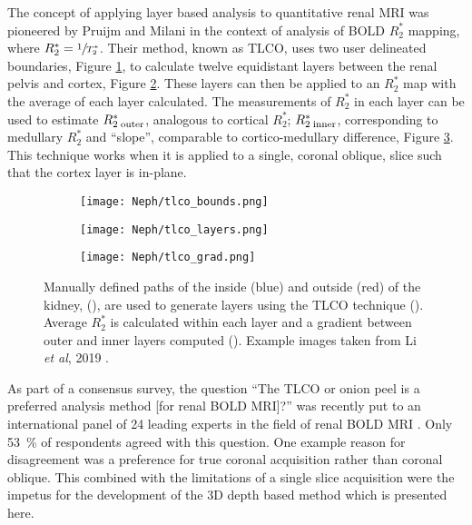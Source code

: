 The concept of applying layer based analysis to quantitative renal \ac{MRI} was pioneered by Pruijm and Milani \cite{piskunowicz_new_2015, milani_reduction_2017, pruijm_blood_2017, li_renal_2019} in the context of analysis of \ac{BOLD} $R_2^*$ mapping, where $R_2^*=\sfrac{1}{T_2^*}$. Their method, known as \ac{TLCO}, uses two user delineated boundaries, Figure \ref{fig:ex_tlco_bounds}, to calculate twelve equidistant layers between the renal pelvis and cortex, Figure \ref{fig:ex_tlco_layers}. These layers can then be applied to an $R_2^*$ map with the average of each layer calculated. The measurements of $R_2^*$ in each layer can be used to estimate $R_{2\;\textup{outer}}^*$, analogous to cortical $R_2^*$; $R_{2\;\textup{inner}}^*$, corresponding to medullary $R_2^*$ and ``slope'', comparable to  cortico-medullary difference, Figure \ref{fig:ex_tlco_grad}. This technique works when it is applied to a single, coronal oblique, slice such that the cortex layer is in-plane.

\begin{figure}[H]
	\centering
	\begin{subfigure}[c]{0.23\textwidth}
		\centering
		\texttt{[image: Neph/tlco\_bounds.png]}
		\caption{}
		\label{fig:ex_tlco_bounds}
	\end{subfigure}
	\hfill
	\begin{subfigure}[c]{0.23\textwidth}
		\centering
		\texttt{[image: Neph/tlco\_layers.png]}
		\caption{}
		\label{fig:ex_tlco_layers}
	\end{subfigure}
	\hfill
	\begin{subfigure}[c]{0.47\textwidth}
		\centering
		\texttt{[image: Neph/tlco\_grad.png]}
		\caption{}
		\label{fig:ex_tlco_grad}
	\end{subfigure}
	\caption{Manually defined paths of the inside (blue) and outside (red) of the kidney, (), are used to generate layers using the \ac{TLCO} technique (). Average $R_2^*$ is calculated within each layer and a gradient between outer and inner layers computed (). Example images taken from Li \textit{et al}, 2019 \cite{li_renal_2019}.}
	\label{fig:ex_tlco}
\end{figure}

As part of a consensus survey, the question ``The \ac{TLCO} or onion peel is a preferred analysis method [for renal \ac{BOLD} \ac{MRI}]?'' was recently put to an international panel of 24 leading experts in the field of renal \ac{BOLD} \ac{MRI} \cite{bane_consensus-based_2020}. Only 53~\% of respondents agreed with this question. One example reason for disagreement was a preference for true coronal acquisition rather than coronal oblique. This combined with the limitations of a single slice acquisition were the impetus for the development of the 3D depth based method which is presented here.

